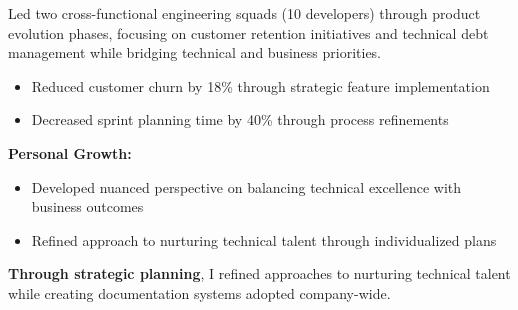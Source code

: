 \documentclass[a4paper,10pt]{article}
\begin{document}
{\begin{minipage}{\dimexpr\textwidth-2\fboxsep\relax}
		Led two cross-functional engineering squads (10 developers) through product evolution phases, focusing on customer retention initiatives and technical debt management while bridging technical and business priorities.

		\vspace{0.2cm}
		\begin{itemize}[label=\textcolor{darkblue}{\textbullet}, leftmargin=*, nosep]
			\item Reduced customer churn by 18\% through strategic feature implementation
			\item Decreased sprint planning time by 40\% through process refinements
		\end{itemize}

		\vspace{0.2cm}
		\textbf{Personal Growth:}
		\vspace{0.2cm}
		\begin{itemize}[label=\textcolor{darkblue}{\textbullet}, leftmargin=*, nosep]
			\item Developed nuanced perspective on balancing technical excellence with business outcomes
			\item Refined approach to nurturing technical talent through individualized plans
		\end{itemize}

		\vspace{0.4cm}

        \textbf{Through strategic planning}, I refined approaches to nurturing technical talent while creating documentation systems adopted company-wide.


		\vspace{0.2cm} %
		    \end{minipage}}
\end{document}
